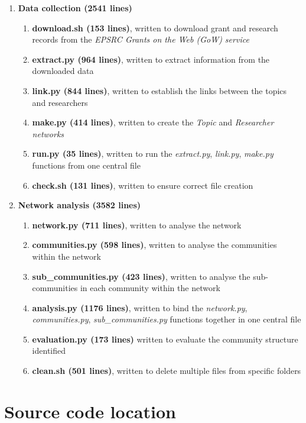 \begin{enumerate}[itemsep=0cm, label*=\arabic*.]
    \item \textbf{Data collection (2541 lines)}
\begin{enumerate}[itemsep=0cm, label*=\arabic*.]
    \item \textbf{download.sh (153 lines)}, written to download grant and research records from the \textit{EPSRC Grants on the Web (GoW) service}
    \item \textbf{extract.py (964 lines)}, written to extract information from the downloaded data
    \item \textbf{link.py (844 lines)}, written to establish the links between the topics and researchers
    \item \textbf{make.py (414 lines)}, written to create the \textit{Topic} and \textit{Researcher networks}
    \item \textbf{run.py (35 lines)}, written to run the \textit{extract.py}, \textit{link.py}, \textit{make.py} functions from one central file
    \item \textbf{check.sh (131 lines)}, written to ensure correct file creation
\end{enumerate}
    \item \textbf{Network analysis (3582 lines)}
\begin{enumerate}[itemsep=0cm, label*=\arabic*.]
    \item \textbf{network.py (711 lines)}, written to analyse the network
    \item \textbf{communities.py (598 lines)}, written to analyse the communities within the network
    \item \textbf{sub\_communities.py (423 lines)}, written to analyse the sub-communities in each community within the network
    \item \textbf{analysis.py (1176 lines)}, written to bind the \textit{network.py}, \textit{communities.py}, \textit{sub\_communities.py} functions together in one central file
    \item \textbf{evaluation.py (173 lines)} written to evaluate the community structure identified
    \item \textbf{clean.sh (501 lines)}, written to delete multiple files from specific folders
\end{enumerate}
\end{enumerate}

\section{Source code location}

